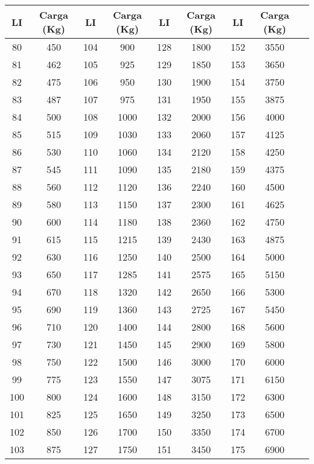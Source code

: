 \documentclass[varwidth=\maxdimen]{standalone}
\begin{document}
\begin{tabular}{ c c c c c c c c c }
	\toprule
	LI & Carga (Kg) & LI & Carga (Kg) & LI & Carga (Kg) &
	LI & Carga (Kg) \\ 
	\midrule
	80	& 450	& 104	& 900	& 128	& 1800	& 152	& 3550 \\
	81	& 462	& 105	& 925	& 129	& 1850	& 153	& 3650 \\
	82	& 475	& 106	& 950	& 130	& 1900	& 154	& 3750 \\
	83	& 487	& 107	& 975	& 131	& 1950	& 155	& 3875 \\
	84	& 500	& 108	& 1000	& 132	& 2000	& 156	& 4000 \\
	85	& 515	& 109	& 1030	& 133	& 2060	& 157	& 4125 \\
	86	& 530	& 110	& 1060	& 134	& 2120	& 158	& 4250 \\
	87	& 545	& 111	& 1090	& 135	& 2180	& 159	& 4375 \\
	88	& 560	& 112	& 1120	& 136	& 2240	& 160	& 4500 \\
	89	& 580	& 113	& 1150	& 137	& 2300	& 161	& 4625 \\
	90	& 600	& 114	& 1180	& 138	& 2360	& 162	& 4750 \\
	91	& 615	& 115	& 1215	& 139	& 2430	& 163	& 4875 \\
	92	& 630	& 116	& 1250	& 140	& 2500	& 164	& 5000 \\
	93	& 650	& 117	& 1285	& 141	& 2575	& 165	& 5150 \\
	94	& 670	& 118	& 1320	& 142	& 2650	& 166	& 5300 \\
	95 	& 690	& 119	& 1360	& 143	& 2725	& 167	& 5450 \\
	96 	& 710	& 120	& 1400	& 144	& 2800	& 168	& 5600 \\
	97	& 730	& 121	& 1450	& 145	& 2900	& 169	& 5800 \\
	98	& 750	& 122	& 1500	& 146	& 3000	& 170	& 6000 \\
	99	& 775	& 123	& 1550	& 147	& 3075	& 171	& 6150 \\
	100	& 800	& 124	& 1600	& 148	& 3150	& 172	& 6300 \\
	101	& 825	& 125	& 1650	& 149	& 3250	& 173	& 6500 \\
	102	& 850	& 126	& 1700	& 150	& 3350	& 174	& 6700 \\
	103	& 875	& 127	& 1750	& 151	& 3450	& 175	& 6900 \\
	\bottomrule
\end{tabular}
\end{document}
